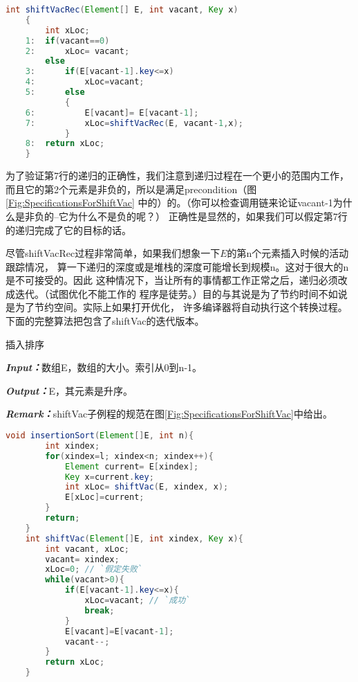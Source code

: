 \begin{lstlisting}[language={Java},keywordstyle=\color{blue!70}, commentstyle=\color{red!50!green!50!blue!50}]
    int shiftVacRec(Element[] E, int vacant, Key x)
    {
        int xLoc;
    1:  if(vacant==0)
    2:      xLoc= vacant;
        else
    3:      if(E[vacant-1].key<=x)
    4:          xLoc=vacant;
    5:      else
            {
    6:          E[vacant]= E[vacant-1];
    7:          xLoc=shiftVacRec(E, vacant-1,x);
            }
    8:  return xLoc;
    }
\end{lstlisting}


为了验证第7行的递归的正确性，我们注意到递归过程在一个更小的范围内工作，
而且它的第2个元素是非负的，所以是满足precondition（图\ref{Fig:SpecificationsForShiftVac}
中的）的。（你可以检查调用链来论证vacant-1为什么是非负的--它为什么不是负的呢？）
正确性是显然的，如果我们可以假定第7行的递归完成了它的目标的话。

尽管shiftVacRec过程非常简单，如果我们想象一下$E$的第n个元素插入时候的活动跟踪情况，
算一下递归的深度或是堆栈的深度可能增长到规模n。这对于很大的n是不可接受的。因此
这种情况下，当让所有的事情都工作正常之后，递归必须改成迭代。（试图优化不能工作的
程序是徒劳。）目的与其说是为了节约时间不如说是为了节约空间。实际上如果打开优化，
许多编译器将自动执行这个转换过程。下面的完整算法把包含了shiftVac的迭代版本。

\begin{algorithm}
插入排序

{\textbf{\emph{Input：}}}数组E，数组的大小。索引从0到n-1。

{\textbf{\emph{Output：}}}E，其元素是升序。

{\textbf{\emph{Remark：}}}shiftVac子例程的规范在图\ref{Fig:SpecificationsForShiftVac}中给出。

\end{algorithm}
\begin{lstlisting}[language={Java},keywordstyle=\color{blue!70}, commentstyle=\color{red!50!green!50!blue!50}]
    void insertionSort(Element[]E, int n){
        int xindex;
        for(xindex=l; xindex<n; xindex++){
            Element current= E[xindex];
            Key x=current.key;
            int xLoc= shiftVac(E, xindex, x);
            E[xLoc]=current;
        }
        return;
    }
    int shiftVac(Element[]E, int xindex, Key x){
        int vacant, xLoc;
        vacant= xindex;
        xLoc=0; // `假定失败`
        while(vacant>0){
            if(E[vacant-1].key<=x){
                xLoc=vacant; // `成功`
                break;
            }
            E[vacant]=E[vacant-1];
            vacant--;
        }
        return xLoc;
    }
\end{lstlisting}


